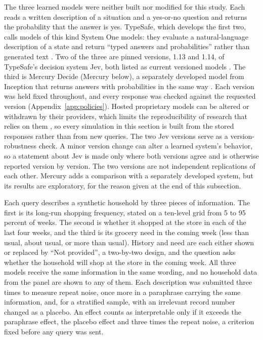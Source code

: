 \documentclass[11pt]{article}
\begin{document}
The three learned models were neither built nor modified for this study. Each reads a written description of a situation and a yes-or-no question and
returns the probability that the answer is yes. TypeSafe, which develops the first two, calls
models of this kind System One models: they evaluate a natural-language description of a state
and return ``typed answers and probabilities'' rather than generated text
\citep{typesafe_systemone}. Two of the three are pinned versions, 1.13 and 1.14, of TypeSafe's
decision system Jev, both listed as current versioned models \citep{typesafe_models}. The third
is Mercury Decide (Mercury below), a separately developed model from Inception that returns answers with
probabilities in the same way \citep{inception_decisions}. Each version was held fixed
throughout, and every response was checked against the requested version (Appendix~\ref{app:policies}).
Hosted proprietary models can be altered or withdrawn by their providers, which limits the
reproducibility of research that relies on them \citep{palmer2024}, so every simulation in this
section is built from the stored responses rather than from new queries. The two Jev
versions serve as a version-robustness check. A minor version change can alter a learned
system's behavior, so a statement about Jev is made only where both versions agree and is
otherwise reported version by version. The two versions are not independent replications of
each other. Mercury adds a comparison with a separately developed system, but its results are
exploratory, for the reason given at the end of this subsection.

Each query describes a synthetic household by three pieces of information. The first is its
long-run shopping frequency, stated on a ten-level grid from 5 to 95 percent of weeks. The
second is whether it shopped at the store in each of the last four weeks, and the third is its
grocery need in the coming week (less than usual, about usual, or more than usual). History and need are each either shown
or replaced by ``Not provided'', a two-by-two design, and the question asks whether the
household will shop at the store in the coming week. All three models receive the same
information in the same wording, and no household data from the panel are shown to any of
them. Each description was submitted three times to measure repeat noise, once more in a
paraphrase carrying the same information, and, for a stratified sample, with an irrelevant
record number changed as a placebo. An effect counts as interpretable only if it exceeds the
paraphrase effect, the placebo effect and three times the repeat noise, a criterion fixed
before any query was sent.
\end{document}
